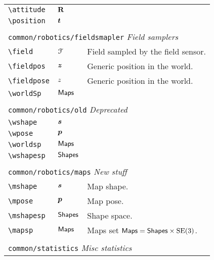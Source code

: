 \begin{longtable}{lll}
 {\color[rgb]{0.5,0.5,0.5}\texttt{\textbackslash attitude}} & $\mathbf{R}$ & \\ 
 {\color[rgb]{0.5,0.5,0.5}\texttt{\textbackslash position}} & $\boldsymbol{t}$ & \\ 
  &  & \\ 
 \multicolumn{3}{l}{{\color[rgb]{0.5,0.5,0.5}\texttt{common/robotics/fieldsmapler}} \emph{Field samplers}}\\ 
 \hline
{\color[rgb]{0.5,0.5,0.5}\texttt{\textbackslash field}} & $\mathcal{F}$ &  Field sampled by the field sensor.\\ 
 {\color[rgb]{0.5,0.5,0.5}\texttt{\textbackslash fieldpos}} & $\boldsymbol{z}$ &  Generic position in the world.\\ 
 {\color[rgb]{0.5,0.5,0.5}\texttt{\textbackslash fieldpose}} & $z$ &  Generic position in the world.\\ 
 {\color[rgb]{0.5,0.5,0.5}\texttt{\textbackslash worldSp}} & $\mathsf{Maps}$ & \\ 
  &  & \\ 
 \multicolumn{3}{l}{{\color[rgb]{0.5,0.5,0.5}\texttt{common/robotics/old}} \emph{Deprecated}}\\ 
 \hline
{\color[rgb]{0.5,0.5,0.5}\texttt{\textbackslash wshape}} & $\boldsymbol{s}$ & \\ 
 {\color[rgb]{0.5,0.5,0.5}\texttt{\textbackslash wpose}} & $\boldsymbol{p}$ & \\ 
 {\color[rgb]{0.5,0.5,0.5}\texttt{\textbackslash worldsp}} & $\mathsf{Maps}$ & \\ 
 {\color[rgb]{0.5,0.5,0.5}\texttt{\textbackslash wshapesp}} & $\mathsf{Shapes}$ & \\ 
  &  & \\ 
 \multicolumn{3}{l}{{\color[rgb]{0.5,0.5,0.5}\texttt{common/robotics/maps}} \emph{New stuff}}\\ 
 \hline
{\color[rgb]{0.5,0.5,0.5}\texttt{\textbackslash mshape}} & $\boldsymbol{s}$ &  Map shape.\\ 
 {\color[rgb]{0.5,0.5,0.5}\texttt{\textbackslash mpose}} & $\boldsymbol{p}$ &  Map pose.\\ 
 {\color[rgb]{0.5,0.5,0.5}\texttt{\textbackslash mshapesp}} & $\mathsf{Shapes}$ &  Shape space.\\ 
 {\color[rgb]{0.5,0.5,0.5}\texttt{\textbackslash mapsp}} & $\mathsf{Maps}$ &  Maps set $\mathsf{Maps} = \mathsf{Shapes} \times \mathrm{SE(3)}$.\\ 
  &  & \\ 
 \multicolumn{3}{l}{{\color[rgb]{0.5,0.5,0.5}\texttt{common/statistics}} \emph{Misc statistics}}\\ 

\end{longtable}
